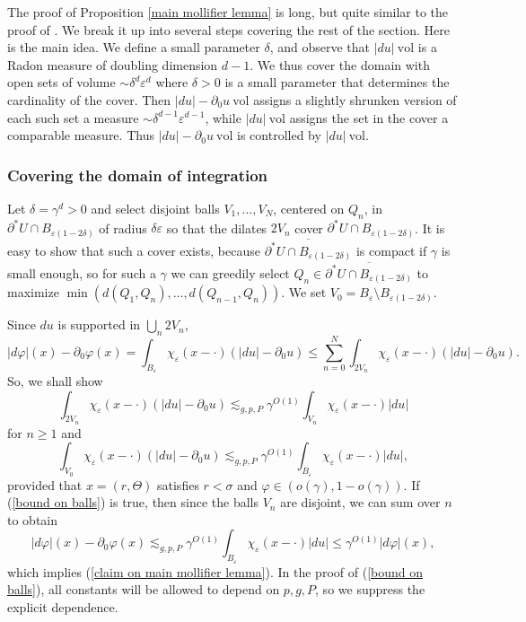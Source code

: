 \documentclass[reqno,12pt,letterpaper]{amsart}
\newcommand{\vol}{\mathrm{vol}}
\theoremstyle{definition}
\numberwithin{equation}{section}
\begin{document}
The proof of Proposition \ref{main mollifier lemma} is long, but quite similar to the proof of \cite[Theorem 7.3]{Giusti77}.
We break it up into several steps covering the rest of the section.
Here is the main idea. We define a small parameter $\delta$, and observe that $|du| ~\vol$ is a Radon measure of doubling dimension $d - 1$.
We thus cover the domain with open sets of volume $\sim \delta^d\varepsilon^d$ where $\delta > 0$ is a small parameter that determines the cardinality of the cover.
Then $|du| - \partial_0u ~\vol$ assigns a slightly shrunken version of each such set a measure $\sim \delta^{d - 1} \varepsilon^{d - 1}$, while $|du|~\vol$ assigns the set in the cover a comparable measure.
Thus $|du| - \partial_0u ~\vol$ is controlled by $|du|~\vol$.

\subsubsection{Covering the domain of integration}
Let $\delta = \gamma^d > 0$ and select disjoint balls $V_1, \dots, V_N$, centered on $Q_n$, in $\partial^* U \cap B_{\varepsilon(1 - 2\delta)}$ of radius $\delta\varepsilon$ so that the dilates $2V_n$ cover $\partial^* U \cap B_{\varepsilon(1 - 2\delta)}$.
It is easy to show that such a cover exists, because $\overline{\partial^* U \cap B_{\varepsilon(1 - 2\delta)}}$ is compact if $\gamma$ is small enough, so for such a $\gamma$ we can greedily select $Q_n \in \overline{\partial^* U \cap B_{\varepsilon(1 - 2\delta)}}$ to maximize $\min(d(Q_1, Q_n), \dots, d(Q_{n - 1}, Q_n))$.
We set $V_0 = B_\varepsilon \setminus B_{\varepsilon(1 - 2\delta)}$.

Since $du$ is supported in $\bigcup_n 2V_n$,
$$|d\varphi|(x) - \partial_0\varphi(x) = \int_{B_\varepsilon} \chi_\varepsilon(x - \cdot)(|du| - \partial_0 u) \leq \sum_{n=0}^N \int_{2V_n} \chi_\varepsilon(x - \cdot)(|du| - \partial_0 u).$$
So, we shall show
\begin{equation}\label{bound on balls}
\int_{2V_n} \chi_\varepsilon(x - \cdot)(|du| - \partial_0u) \lesssim_{g, p, P} \gamma^{O(1)} \int_{V_n} \chi_\varepsilon(x - \cdot)|du|
\end{equation}
for $n \geq 1$ and
\begin{equation}\label{bound on balls 2}
\int_{V_0} \chi_\varepsilon(x - \cdot)(|du| - \partial_0u) \lesssim_{g, p, P} \gamma^{O(1)} \int_{B_\varepsilon} \chi_\varepsilon(x - \cdot)|du|,
\end{equation}
provided that $x = (r, \Theta)$ satisfies $r < \sigma$ and $\varphi \in (o(\gamma), 1 - o(\gamma))$.
If (\ref{bound on balls}) is true, then since the balls $V_n$ are disjoint, we can sum over $n$ to obtain
\begin{equation}\label{claim on main mollifier lemma 2}|d\varphi|(x) - \partial_0\varphi(x) \lesssim_{g, p, P} \gamma^{O(1)} \int_{B_\varepsilon} \chi_\varepsilon(x - \cdot)|du| \leq \gamma^{O(1)} |d\varphi|(x),
\end{equation}
which implies (\ref{claim on main mollifier lemma}).
In the proof of (\ref{bound on balls}), all constants will be allowed to depend on $p,g,P$, so we suppress the explicit dependence.
\end{document}
